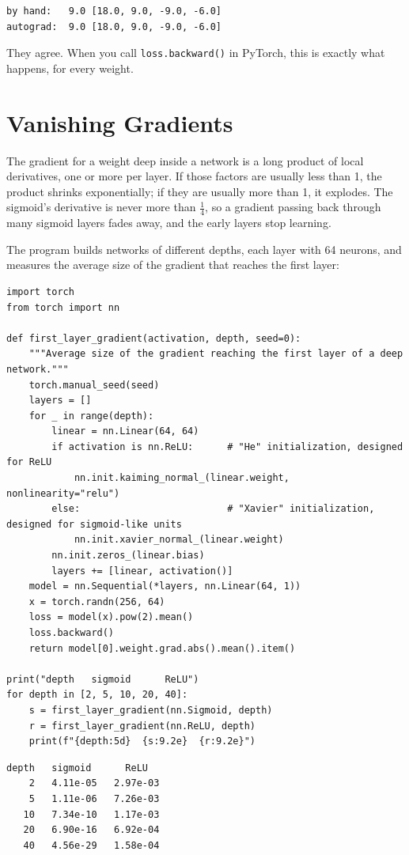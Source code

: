 \begin{verbatim}
by hand:   9.0 [18.0, 9.0, -9.0, -6.0]
autograd:  9.0 [18.0, 9.0, -9.0, -6.0]
\end{verbatim}

They agree. When you call \verb|loss.backward()| in PyTorch, this is exactly what happens, for every weight.

\section{Vanishing Gradients}
The gradient for a weight deep inside a network is a long product of local derivatives, one or more per layer. If
those factors are usually less than 1, the product shrinks exponentially; if they are usually more than 1, it
explodes. The sigmoid's derivative is never more than $\frac{1}{4}$, so a gradient passing back through many sigmoid
layers fades away, and the early layers stop learning.

The program  builds networks of different depths, each layer with 64 neurons, and measures
the average size of the gradient that reaches the first layer:

\begin{verbatim}
import torch
from torch import nn

def first_layer_gradient(activation, depth, seed=0):
    """Average size of the gradient reaching the first layer of a deep network."""
    torch.manual_seed(seed)
    layers = []
    for _ in range(depth):
        linear = nn.Linear(64, 64)
        if activation is nn.ReLU:      # "He" initialization, designed for ReLU
            nn.init.kaiming_normal_(linear.weight, nonlinearity="relu")
        else:                          # "Xavier" initialization, designed for sigmoid-like units
            nn.init.xavier_normal_(linear.weight)
        nn.init.zeros_(linear.bias)
        layers += [linear, activation()]
    model = nn.Sequential(*layers, nn.Linear(64, 1))
    x = torch.randn(256, 64)
    loss = model(x).pow(2).mean()
    loss.backward()
    return model[0].weight.grad.abs().mean().item()

print("depth   sigmoid      ReLU")
for depth in [2, 5, 10, 20, 40]:
    s = first_layer_gradient(nn.Sigmoid, depth)
    r = first_layer_gradient(nn.ReLU, depth)
    print(f"{depth:5d}  {s:9.2e}  {r:9.2e}")
\end{verbatim}

\begin{verbatim}
depth   sigmoid      ReLU
    2   4.11e-05   2.97e-03
    5   1.11e-06   7.26e-03
   10   7.34e-10   1.17e-03
   20   6.90e-16   6.92e-04
   40   4.56e-29   1.58e-04
\end{verbatim}


